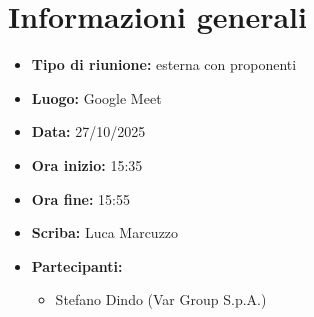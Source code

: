 \section{Informazioni generali}

\begin{itemize}
    \item \textbf{Tipo di riunione:} esterna con proponenti
    \item \textbf{Luogo:} Google Meet
    \item \textbf{Data:} 27/10/2025
    \item \textbf{Ora inizio:} 15:35
    \item \textbf{Ora fine:} 15:55
    \item \textbf{Scriba:} Luca Marcuzzo
    \item \textbf{Partecipanti:}
    \begin{itemize}
        \renewcommand{\labelitemii}{--}
        \item Stefano Dindo (Var Group S.p.A.)
    \end{itemize}
\end{itemize}
